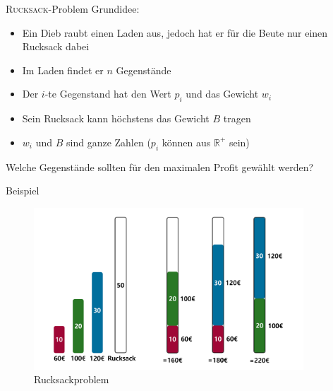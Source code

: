\begin{frame}{\textsc{Rucksack}-Problem}
    Grundidee: 
    
    \begin{itemize}
        \item Ein Dieb raubt einen Laden aus, jedoch hat er für die Beute nur einen Rucksack dabei
        \item Im Laden findet er $n$ Gegenstände
        \item Der $i$-te Gegenstand hat den Wert $p_i$ und das Gewicht $w_i$
        \item Sein Rucksack kann höchstens das Gewicht $B$ tragen
        \item $w_i$ und $B$ sind ganze Zahlen ($p_i$ können aus $\mathbb{R}^+$ sein)
    \end{itemize}
    \alert{Welche Gegenstände sollten für den maximalen Profit gewählt werden?} 
\end{frame}
\begin{frame}{Beispiel}
    \begin{figure}[ht]
    	\centering
    	\includegraphics[width=0.9\textwidth]{img/Rucksack.pdf}
    	\caption{Rucksackproblem}
    	\label{fig:rucksack}
    \end{figure}
\end{frame}
